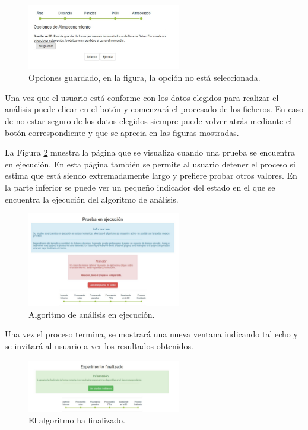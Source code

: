 \begin{figure}[h]
  \centering
    \includegraphics[width=0.6\textwidth]{../img/manualusuario/guardar.jpg}
  \caption{Opciones guardado, en la figura, la opción no está seleccionada.}
  \label{guardar}
\end{figure}

Una vez que el usuario está conforme con los datos elegidos para realizar el análisis puede clicar en el botón  y comenzará el procesado de los ficheros. En caso de no estar seguro de los datos elegidos siempre puede volver atrás mediante el botón correspondiente y que se aprecia en las figuras mostradas.

La Figura \ref{enejecucion} muestra la página que se visualiza cuando una prueba se encuentra en ejecución. En esta página también se permite al usuario detener el proceso si estima que está siendo extremadamente largo y prefiere probar otros valores. En la parte inferior se puede ver un pequeño indicador del estado en el que se encuentra la ejecución del algoritmo de análisis.

\begin{figure}[h]
  \centering
    \includegraphics[width=0.6\textwidth]{../img/manualusuario/enejecucion.jpg}
  \caption{Algoritmo de análisis en ejecución.}
  \label{enejecucion}
\end{figure}

Una vez el proceso termina, se mostrará una nueva ventana indicando tal echo y se invitará al usuario a ver los resultados obtenidos.

\begin{figure}[h]
  \centering
    \includegraphics[width=0.6\textwidth]{../img/manualusuario/terminado.jpg}
  \caption{El algoritmo ha finalizado.}
  \label{terminado}
\end{figure}

